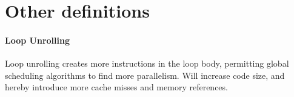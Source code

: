 \documentclass{article}
\begin{document}


\section{Other definitions} %
\label{sec:Other definitions}

\paragraph{Loop Unrolling} %
\label{par:Loop Unrolling}
Loop unrolling creates more instructions in the loop body, permitting global scheduling algorithms to find more parallelism. Will increase code size, and hereby introduce more cache misses and memory references.

\end{document}
